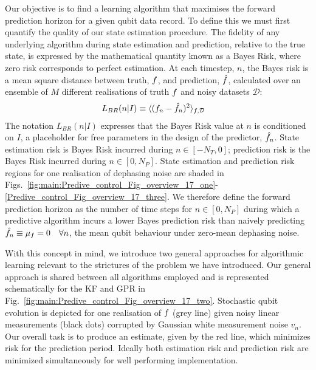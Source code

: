 \documentclass[pra, reprint]{revtex4-1}
\begin{document}
Our objective is to find a learning algorithm that maximises the forward prediction horizon for a given qubit data record.  To define this we must first quantify the quality of our state estimation procedure.  The fidelity of any underlying algorithm during state estimation and prediction, relative to the true state, is expressed by the mathematical quantity known as a Bayes Risk, where zero risk corresponds to perfect estimation. At each timestep, $n$, the Bayes risk is a mean square distance between truth, $f$, and prediction, $\hat{f}$, calculated over an ensemble of $M$ different realisations of truth $f$ and noisy datasets $\mathcal{D}$:
\begin{align}
L_{BR}(n | I) & \equiv \langle(f_n - \hat{f}_n)^2 \rangle_{f,\mathcal{D}} \label{eqn:main:sec:ap_opt_LossBR}
\end{align}
The notation $L_{BR}(n | I)$ expresses that the Bayes Risk value at $n$ is conditioned on $I$, a placeholder for free parameters in the design of the predictor, $\hat{f}_n$. State estimation risk is Bayes Risk incurred during $n \in [-N_T, 0]$; prediction risk is the Bayes Risk incurred during $n \in [0, N_P]$. State estimation and prediction risk regions for one realisation of dephasing noise are shaded in Figs.~\ref{fig:main:Predive_control_Fig_overview_17_one}-\ref{Predive_control_Fig_overview_17_three}.  We therefore define the forward prediction horizon as the number of time steps for $ n \in [0, N_P]$ during which a predictive algorithm incurs a lower Bayes prediction risk than naively predicting $\hat{f}_n \equiv \mu_f = 0 \quad \forall n$, the mean qubit behaviour under zero-mean dephasing noise. 

With this concept in mind, we introduce two general approaches for algorithmic learning relevant to the strictures of the problem we have introduced.  Our general approach is shared between all algorithms employed and is represented schematically for the KF and GPR in Fig.~\ref{fig:main:Predive_control_Fig_overview_17_two}. Stochastic qubit evolution is depicted for one realisation of $f$ (grey line) given noisy linear measurements (black dots) corrupted by Gaussian white measurement noise $v_n$.  Our overall task is to produce an estimate, given by the red line, which minimizes risk for the prediction period.  Ideally both estimation risk and prediction risk are minimized simultaneously for well performing implementation.
\end{document}
